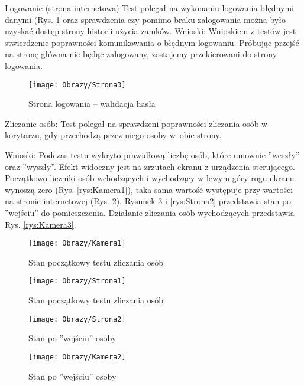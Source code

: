 \begin{enumerate*}
	\item Logowanie (strona internetowa) \newline
	Test polegał na wykonaniu logowania błędnymi danymi (Rys. \ref{rys:Strona3} oraz sprawdzenia czy pomimo braku zalogowania można było uzyskać dostęp strony historii użycia zamków. \newline
	Wnioski: Wnioskiem z testów jest stwierdzenie poprawności komunikowania o błędnym logowaniu. Próbując przejść na stronę główna nie będąc zalogowany, zostajemy przekierowani do strony logowania.
\begin{figure}[ht!]
		\centering
		\texttt{[image: Obrazy/Strona3]}
		\caption{Strona logowania -- walidacja hasła}
		\label{rys:Strona3}
\end{figure}

	\item Zliczanie osób: \newline
	 Test polegał na sprawdzeni poprawności zliczania osób w korytarzu, gdy przechodzą przez niego osoby w~obie strony.
	
	Wnioski: Podczas testu wykryto prawidłową liczbę osób, które umownie ''weszły'' oraz ''wyszły''. Efekt widoczny jest na zrzutach ekranu z urządzenia sterującego. Początkowo liczniki osób wchodzących i wychodzący w lewym góry rogu ekranu wynoszą zero (Rys. \ref{rys:Kamera1}), taka sama wartość występuje przy wartości na stronie internetowej (Rys. \ref{rys:Strona1}). Rysunek \ref{rys:Kamera2} i \ref{rys:Strona2} przedstawia stan po ''wejściu'' do pomieszczenia. Działanie zliczania osób wychodzących przedstawia Rys. \ref{rys:Kamera3}.

	\begin{figure}[ht!]
		\vspace{-0.35cm}
	\begin{minipage}{0.3\textwidth}
		\texttt{[image: Obrazy/Kamera1]}
		\caption{Stan początkowy testu zliczania osób }
		\label{rys:Kamera1}
	\end{minipage}
	\hspace{0.01\textwidth}
	\begin{minipage}{0.69\textwidth}
		\vspace{-1cm}
		\texttt{[image: Obrazy/Strona1]}
		\caption{Stan początkowy testu zliczania osób}
		\label{rys:Strona1}
	\end{minipage}
	\end{figure}

	\begin{figure}[ht!]
		\vspace{-1.5cm}
	\begin{minipage}{0.69\textwidth}
		\texttt{[image: Obrazy/Strona2]}
		\caption{Stan po ''wejściu'' osoby }
		\label{rys:Strona2}
	\end{minipage}
	\hspace{0.01\textwidth}
	\begin{minipage}{0.3\textwidth}
		\texttt{[image: Obrazy/Kamera2]}
		\caption{Stan po ''wejściu'' osoby}
		\label{rys:Kamera2}
	\end{minipage}
\end{figure}


\end{enumerate*}
